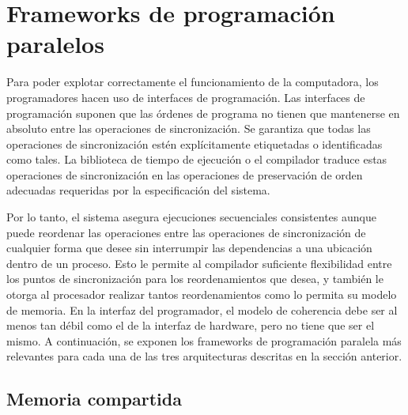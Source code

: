 \section{Frameworks de programación paralelos}
\label{sec:frameworks_programacion_paralelos}

Para poder explotar correctamente el funcionamiento de la computadora, los programadores hacen uso de interfaces de programación. Las interfaces de programación suponen que las órdenes de programa no tienen que mantenerse en absoluto entre las operaciones de sincronización. Se garantiza que todas las operaciones de sincronización estén explícitamente etiquetadas o identificadas como tales. La biblioteca de tiempo de ejecución o el compilador traduce estas operaciones de sincronización en las operaciones de preservación de orden adecuadas requeridas por la especificación del sistema.

Por lo tanto, el sistema asegura ejecuciones secuenciales consistentes aunque puede reordenar las operaciones entre las operaciones de sincronización de cualquier forma que desee sin interrumpir las dependencias a una ubicación dentro de un proceso. Esto le permite al compilador suficiente flexibilidad entre los puntos de sincronización para los reordenamientos que desea, y también le otorga al procesador realizar tantos reordenamientos como lo permita su modelo de memoria. En la interfaz del programador, el modelo de coherencia debe ser al menos tan débil como el de la interfaz de hardware, pero no tiene que ser el mismo. A continuación, se exponen los frameworks de programación paralela más relevantes para cada una de las tres arquitecturas descritas en la sección anterior.

\subsection{Memoria compartida}
\label{sec:frameworks_memoria_compartida}

